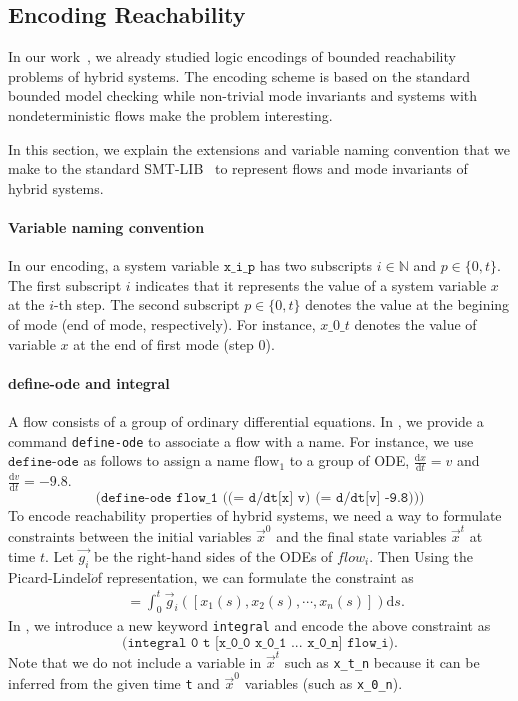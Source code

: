 \subsection{Encoding Reachability}

In our work~\cite{DBLP:journals/corr/GaoKCC14}, we already studied
logic encodings of bounded reachability problems of hybrid
systems. The encoding scheme is based on the standard bounded model
checking while non-trivial mode invariants and systems with
nondeterministic flows make the problem interesting.

In this section, we explain the extensions and variable naming
convention that we make to the standard SMT-LIB~\cite{BarST-SMT-10} to
represent flows and mode invariants of hybrid systems.

\paragraph{Variable naming convention}
In our encoding, a system variable $\texttt{x\_i\_p}$ has two
subscripts $i \in \mathbb{N}$ and $p \in \{0, t\}$. The first
subscript $i$ indicates that it represents the value of a system
variable $x$ at the $i$-th step. The second subscript $p \in \{0, t\}$
denotes the value at the begining of mode (end of mode,
respectively). For instance, $x\_0\_t$ denotes the value of variable
$x$ at the end of first mode (step 0).

\paragraph{define-ode and integral}
A flow consists of a group of ordinary differential equations. In
\drh{}, we provide a command \texttt{define-ode} to associate a flow
with a name. For instance, we use $\texttt{define-ode}$ as follows to
assign a name $\mathrm{flow_1}$ to a group of ODE,
$\frac{\mathrm{d}x}{\mathrm{d}t} = v$ and
$\frac{\mathrm{d}v}{\mathrm{d}t} = -9.8$.
\[
\texttt{(define-ode flow\_1 ((= d/dt[x] v) (= d/dt[v] -9.8)))}
\]
To encode reachability properties of hybrid systems, we need a way to
formulate constraints between the initial variables $\vec{x}^0$ and the
final state variables $\vec{x}^t$ at time $t$. Let $\vec{g_i}$ be the
right-hand sides of the ODEs of $flow_i$. Then Using the
Picard-Lindel$\ddot{o}$f representation, we can formulate the
constraint as
\begin{align*}
[x_1^t, x_2^t, \dots, x_n^t] &= \int_0^t \vec{g}_i([x_1(s), x_2(s), \cdots,
x_n(s)]) \mathrm{d}s.
\end{align*}
In \drh{}, we introduce a new keyword \texttt{integral} and encode the
above constraint as
\[
\texttt{(integral 0 t [x\_0\_0 x\_0\_1 ... x\_0\_n] flow\_i)}.
\]
Note that we do not include a variable in $\vec{x}^t$ such as
\texttt{x\_t\_n} because it can be inferred from the given time
\texttt{t} and $\vec{x}^0$ variables (such as \texttt{x\_0\_n}).
